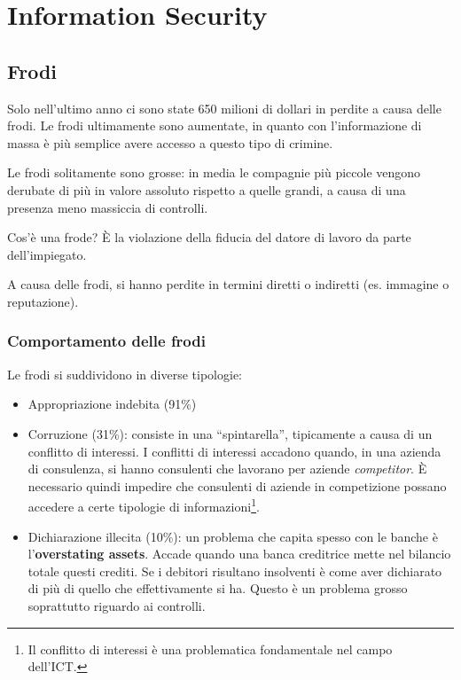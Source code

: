 \part{Information Security}

\chapter{Frodi}
\label{Frodi}

Solo nell'ultimo anno ci sono state 650 milioni di dollari in perdite a causa delle 
frodi. Le frodi ultimamente sono aumentate, in quanto con l'informazione di massa 
è più semplice avere accesso a questo tipo di crimine.

Le frodi solitamente sono grosse: in media le compagnie più piccole vengono
derubate di più in valore assoluto rispetto a quelle grandi, a causa di una 
presenza meno massiccia di controlli.

Cos'è una frode? È la violazione della fiducia del datore di lavoro da parte 
dell'impiegato.

A causa delle frodi, si hanno perdite in termini diretti o 
indiretti (es. immagine o reputazione).

\section{Comportamento delle frodi}

Le frodi si suddividono in diverse tipologie:

\begin{itemize}
  \item Appropriazione indebita (91\%)
  \item Corruzione (31\%): consiste in una ``spintarella'', tipicamente a causa di un conflitto di 
  interessi. I conflitti di interessi accadono quando, in una azienda di 
  consulenza, si hanno consulenti che lavorano per aziende \textit{competitor}.
  È necessario quindi impedire che consulenti di aziende in competizione possano 
  accedere a   certe tipologie di informazioni\footnote{Il conflitto di interessi è una
  problematica fondamentale nel campo dell'ICT.}.
  \item Dichiarazione illecita (10\%): un problema che capita spesso con le banche è l'\textbf{overstating assets}.
  Accade quando una banca creditrice mette nel bilancio totale questi crediti.
  Se i debitori risultano insolventi è come aver dichiarato di più di quello
  che effettivamente si ha. Questo è un problema grosso soprattutto riguardo ai
  controlli.
\end{itemize}
